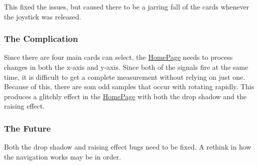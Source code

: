 This fixed the issues, but caused there to be a jarring fall of the cards whenever the joystick was released.

\subsubsection*{The Complication}

Since there are four main cards can select, the \mbox{\hyperlink{classHomePage}{Home\+Page}} needs to process changes in both the x-\/axis and y-\/axis. Since both of the signals fire at the same time, it is difficult to get a complete measurement without relying on just one. Because of this, there are som odd samples that occur with rotating rapidly. This produces a glitchly effect in the \mbox{\hyperlink{classHomePage}{Home\+Page}} with both the drop shadow and the raising effect.

\subsubsection*{The Future}

Both the drop shadow and raising effect bugs need to be fixed. A rethink in how the navigation works may be in order. 